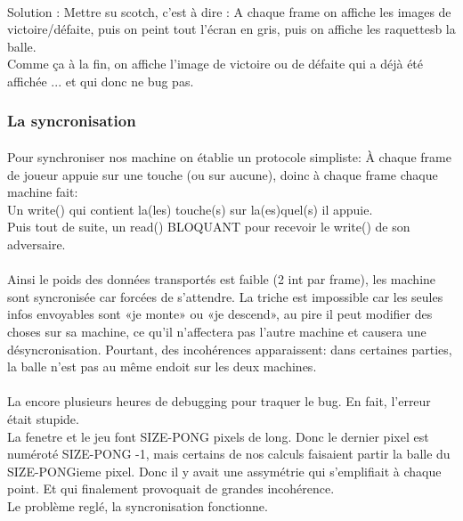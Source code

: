 \documentclass[a4paper, 12pt]{scrreprt}
\begin{document}
\paragraph{}
Solution : Mettre su scotch, c'est à dire : A chaque frame on affiche les images de victoire/défaite, puis on peint tout l'écran en gris, puis on affiche les raquettesb la balle.\\
Comme ça à la fin, on affiche l'image de victoire ou de défaite qui a déjà été affichée ... et qui donc ne bug pas.
\subsubsection*{La syncronisation}
\paragraph{}
Pour synchroniser nos machine on établie un protocole simpliste:
À chaque frame de joueur appuie sur une touche (ou sur aucune), doinc à chaque frame chaque machine fait:
\\Un write() qui contient la(les) touche(s) sur la(es)quel(s) il appuie.
\\Puis tout de suite, un read() BLOQUANT pour recevoir le write() de son adversaire.
\paragraph{}
Ainsi le poids des données transportés est faible (2 int par frame), les machine sont syncronisée car forcées de s'attendre. La triche est impossible car les seules infos envoyables sont «je monte» ou «je descend», au pire il peut modifier des choses sur sa machine, ce qu'il n'affectera pas l'autre machine et causera une désyncronisation.
Pourtant, des incohérences apparaissent: dans certaines parties, la balle n'est pas au même endoit sur les deux machines.
\paragraph{}
La encore plusieurs heures de debugging pour traquer le bug. En fait, l'erreur était stupide.
\\La fenetre et le jeu font SIZE-PONG pixels de long. Donc le dernier pixel est numéroté SIZE-PONG -1, mais certains de nos calculs faisaient partir la balle du SIZE-PONGieme pixel. Donc il y avait une assymétrie qui s'emplifiait à chaque point. Et qui finalement provoquait de grandes incohérence.
\\Le problème reglé, la syncronisation fonctionne.
\end{document}
